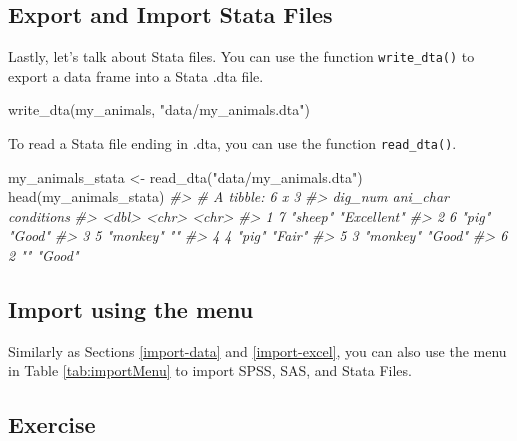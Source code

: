 \documentclass[
]{book}
\newenvironment{Shaded}{\begin{snugshade}}{\end{snugshade}}
\newcommand{\CommentTok}[1]{\textcolor[rgb]{0.56,0.35,0.01}{\textit{#1}}}
\newcommand{\FunctionTok}[1]{\textcolor[rgb]{0.00,0.00,0.00}{#1}}
\newcommand{\NormalTok}[1]{#1}
\newcommand{\OtherTok}[1]{\textcolor[rgb]{0.56,0.35,0.01}{#1}}
\newcommand{\StringTok}[1]{\textcolor[rgb]{0.31,0.60,0.02}{#1}}
\begin{document}
\hypertarget{export-and-import-stata-files}{%
\subsection{Export and Import Stata Files}\label{export-and-import-stata-files}}

Lastly, let's talk about Stata files. You can use the function \texttt{write\_dta()} to export a data frame into a Stata .dta file.

\begin{Shaded}
\begin{Highlighting}[]
\FunctionTok{write\_dta}\NormalTok{(my\_animals, }\StringTok{"data/my\_animals.dta"}\NormalTok{)}
\end{Highlighting}
\end{Shaded}

To read a Stata file ending in .dta, you can use the function \texttt{read\_dta()}.

\begin{Shaded}
\begin{Highlighting}[]
\NormalTok{my\_animals\_stata }\OtherTok{\textless{}{-}} \FunctionTok{read\_dta}\NormalTok{(}\StringTok{"data/my\_animals.dta"}\NormalTok{)}
\FunctionTok{head}\NormalTok{(my\_animals\_stata)}
\CommentTok{\#\textgreater{} \# A tibble: 6 x 3}
\CommentTok{\#\textgreater{}   dig\_num ani\_char conditions }
\CommentTok{\#\textgreater{}     \textless{}dbl\textgreater{} \textless{}chr\textgreater{}    \textless{}chr\textgreater{}      }
\CommentTok{\#\textgreater{} 1       7 "sheep"  "Excellent"}
\CommentTok{\#\textgreater{} 2       6 "pig"    "Good"     }
\CommentTok{\#\textgreater{} 3       5 "monkey" ""         }
\CommentTok{\#\textgreater{} 4       4 "pig"    "Fair"     }
\CommentTok{\#\textgreater{} 5       3 "monkey" "Good"     }
\CommentTok{\#\textgreater{} 6       2 ""       "Good"}
\end{Highlighting}
\end{Shaded}

\hypertarget{import-using-the-menu}{%
\subsection{Import using the menu}\label{import-using-the-menu}}

Similarly as Sections \ref{import-data} and \ref{import-excel}, you can also use the menu in Table \ref{tab:importMenu} to import SPSS, SAS, and Stata Files.

\hypertarget{exercise}{%
\subsection{Exercise}\label{exercise}}
\end{document}
